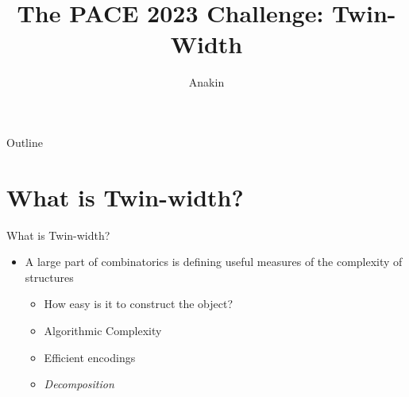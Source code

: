 \documentclass[aspectratio=169]{beamer}
\title{The PACE 2023 Challenge: Twin-Width}
\subtitle{}
\author{Anakin}
\date{}
\begin{document}

\begin{frame}
\titlepage
\end{frame}

\begin{frame}{Outline}
  \tableofcontents
\end{frame}


\section{What is Twin-width?}
\frame{\sectionpage}

\begin{frame}{What is Twin-width?}
    \begin{itemize}
        \item A large part of combinatorics is defining useful measures of the complexity of structures \pause
        \begin{itemize}
            \item How easy is it to construct the object? \pause
            \item Algorithmic Complexity \pause
            \item Efficient encodings \pause
            \item \textcolor{sigma@mainblue}{\emph{Decomposition}}
        \end{itemize}
    \end{itemize}
\end{frame}
\end{document}
